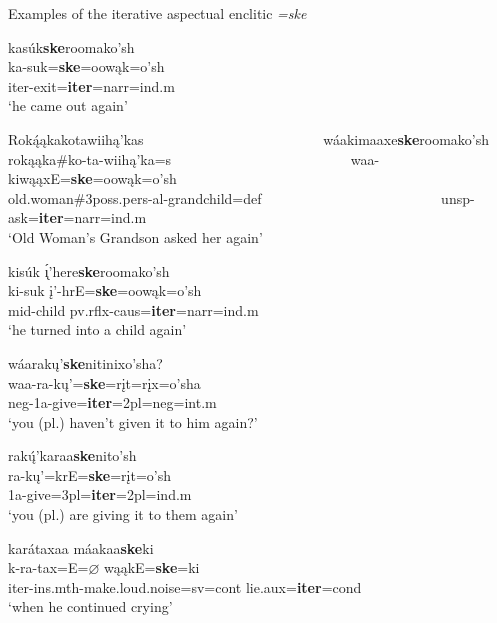 \begin{exe}
\item\label{iterativeaspectualencliticEx} Examples of the iterative aspectual enclitic \textit{=ske}
	\begin{xlist}

	\item\label{iterativeaspectualenclitic1} \glll kasúk\textbf{ske}roomako'sh\\
		ka-suk=\textbf{ske}=oowąk=o'sh\\
		iter-\textnormal{exit}=\textbf{iter}=narr=ind.m\\
		\glt `he came out again' \citep[152]{hollow1973b}
	
	\item\label{iterativeaspectualenclitic2} \glll Roką́ąkakotawiihą'kas ~ ~ ~ ~ ~ ~ ~ ~ ~ ~ ~ ~ ~ ~ ~   wáakimaaxe\textbf{ske}roomako'sh\\
			rokąąka\#ko-ta-wiihą'ka=s ~ ~ ~ ~ ~ ~ ~ ~ ~ ~ ~ ~ ~ ~ ~  waa-kiwąąxE=\textbf{ske}=oowąk=o'sh\\
			\textnormal{old.woman}\#3poss.pers-al-\textnormal{grandchild}=def ~ ~ ~ ~ ~ ~ ~ ~ ~ ~ ~ ~ ~ ~ ~  unsp-\textnormal{ask}=\textbf{iter}=narr=ind.m\\
			\glt `Old Woman's Grandson asked her again' \citep[138]{hollow1973b}

	\item\label{iterativeaspectualenclitic3} \glll kisúk ı̨́'here\textbf{ske}roomako'sh\\
		ki-suk į'-hrE=\textbf{ske}=oowąk=o'sh\\
		mid-\textnormal{child} pv.rflx-caus=\textbf{iter}=narr=ind.m\\
		\glt `he turned into a child again' \citep[150]{hollow1973b}

	\item\label{iterativeaspectualenclitic4}
	\glll wáarakų'\textbf{ske}nitinixo'sha?\\
	waa-ra-kų'=\textbf{ske}=rįt=rįx=o'sha\\
	neg-1a-\textnormal{give}=\textbf{iter}=2pl=neg=int.m\\
	\glt `you (pl.) haven't given it to him again?' \citep[480]{hollow1970}

		\item\label{iterativeaspectualenclitic5}
		\glll rakų́'karaa\textbf{ske}nito'sh\\
		ra-kų'=krE=\textbf{ske}=rįt=o'sh\\
		1a-\textnormal{give}=3pl=\textbf{iter}=2pl=ind.m\\
		\glt `you (pl.) are giving it to them again' \citep[453]{hollow1970}

	\item\label{iterativeaspectualenclitic6}
	\glll karátaxaa máakaa\textbf{ske}ki\\
	k-ra-tax=E=$\varnothing$ wąąkE=\textbf{ske}=ki\\
	iter-ins.mth-\textnormal{make.loud.noise}=sv=cont \textnormal{lie}.aux=\textbf{iter}=cond\\
	\glt `when he continued crying' \citep[244]{trechter2012b}
	
	\end{xlist}
\end{exe}

